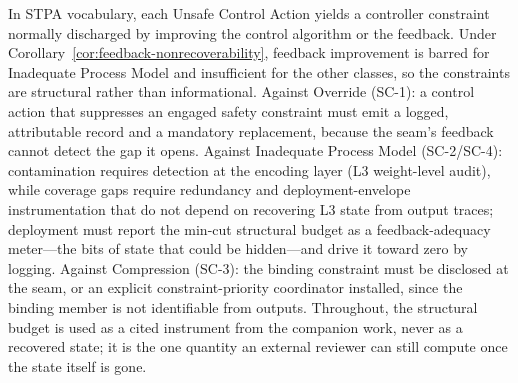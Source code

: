 In STPA vocabulary, each Unsafe Control Action yields a controller constraint normally discharged by improving the control algorithm or the feedback. Under Corollary~\ref{cor:feedback-nonrecoverability}, feedback improvement is barred for Inadequate Process Model and insufficient for the other classes, so the constraints are structural rather than informational. Against Override (SC-1): a control action that suppresses an engaged safety constraint must emit a logged, attributable record and a mandatory replacement, because the seam's feedback cannot detect the gap it opens. Against Inadequate Process Model (SC-2/SC-4): contamination requires detection at the encoding layer (L3 weight-level audit), while coverage gaps require redundancy and deployment-envelope instrumentation that do not depend on recovering L3 state from output traces; deployment must report the min-cut structural budget as a feedback-adequacy meter---the bits of state that could be hidden---and drive it toward zero by logging. Against Compression (SC-3): the binding constraint must be disclosed at the seam, or an explicit constraint-priority coordinator installed, since the binding member is not identifiable from outputs. Throughout, the structural budget is used as a cited instrument from the companion work, never as a recovered state; it is the one quantity an external reviewer can still compute once the state itself is gone.

